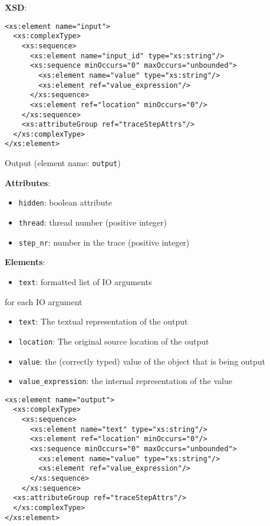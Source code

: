 \documentclass[12pt]{article}
\begin{document}
\noindent\textbf{XSD}:
\begin{verbatim}
<xs:element name="input">
  <xs:complexType>
    <xs:sequence>
      <xs:element name="input_id" type="xs:string"/>
      <xs:sequence minOccurs="0" maxOccurs="unbounded">
        <xs:element name="value" type="xs:string"/>
        <xs:element ref="value_expression"/>
      </xs:sequence>
      <xs:element ref="location" minOccurs="0"/>
    </xs:sequence>
    <xs:attributeGroup ref="traceStepAttrs"/>
  </xs:complexType>
</xs:element>
\end{verbatim}


\begin{center}
  {\Large Output} (element name: \texttt{output})
\end{center}

\noindent\textbf{Attributes}:
\begin{itemize}
\item \texttt{hidden}: boolean attribute
\item \texttt{thread}: thread number (positive integer)
\item \texttt{step\_nr}: number in the trace (positive integer)
\end{itemize}

\noindent\textbf{Elements}:
\begin{itemize}
\item \texttt{text}: formatted list of IO arguments
\end{itemize}
for each IO argument
\begin{itemize}
\item \texttt{text}: The textual representation of the output
\item \texttt{location}: The original source location of the output
\item \texttt{value}: the (correctly typed) value of the object that is being output
\item \texttt{value\_expression}: the internal representation of the value
\end{itemize}

\begin{verbatim}
<xs:element name="output">
  <xs:complexType>
    <xs:sequence>
      <xs:element name="text" type="xs:string"/>
      <xs:element ref="location" minOccurs="0"/>
      <xs:sequence minOccurs="0" maxOccurs="unbounded">
        <xs:element name="value" type="xs:string"/>
        <xs:element ref="value_expression"/>
      </xs:sequence>
    </xs:sequence>
  <xs:attributeGroup ref="traceStepAttrs"/>
  </xs:complexType>
</xs:element>
\end{verbatim}
\end{document}

